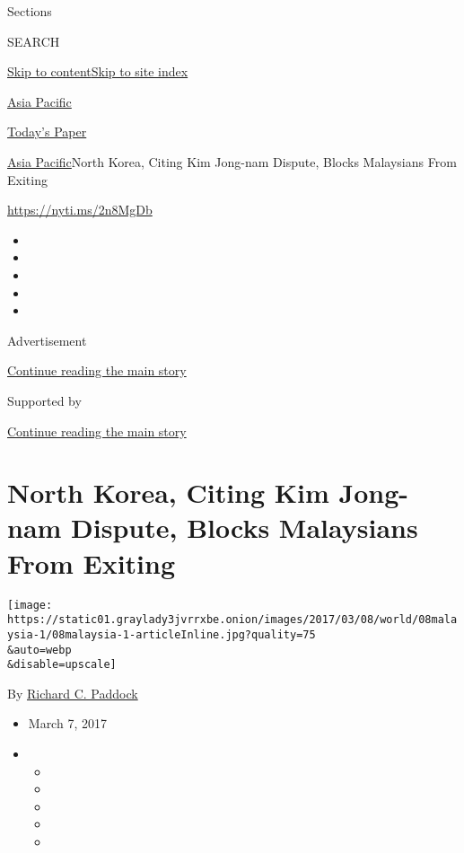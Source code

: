 Sections

SEARCH

\protect\hyperlink{site-content}{Skip to
content}\protect\hyperlink{site-index}{Skip to site index}

\href{https://www.nytimes3xbfgragh.onion/section/world/asia}{Asia
Pacific}

\href{https://myaccount.nytimes3xbfgragh.onion/auth/login?response_type=cookie\&client_id=vi}{}

\href{https://www.nytimes3xbfgragh.onion/section/todayspaper}{Today's
Paper}

\href{/section/world/asia}{Asia Pacific}\textbar{}North Korea, Citing
Kim Jong-nam Dispute, Blocks Malaysians From Exiting

\url{https://nyti.ms/2n8MgDb}

\begin{itemize}
\item
\item
\item
\item
\item
\end{itemize}

Advertisement

\protect\hyperlink{after-top}{Continue reading the main story}

Supported by

\protect\hyperlink{after-sponsor}{Continue reading the main story}

\hypertarget{north-korea-citing-kim-jong-nam-dispute-blocks-malaysians-from-exiting}{%
\section{North Korea, Citing Kim Jong-nam Dispute, Blocks Malaysians
From
Exiting}\label{north-korea-citing-kim-jong-nam-dispute-blocks-malaysians-from-exiting}}

\texttt{[image: https://static01.graylady3jvrrxbe.onion/images/2017/03/08/world/08malaysia-1/08malaysia-1-articleInline.jpg?quality=75\\\&auto=webp\\\&disable=upscale]}

By
\href{https://www.nytimes3xbfgragh.onion/by/richard-c-paddock}{Richard
C. Paddock}

\begin{itemize}
\item
  March 7, 2017
\item
  \begin{itemize}
  \item
  \item
  \item
  \item
  \item
  \end{itemize}
\end{itemize}

